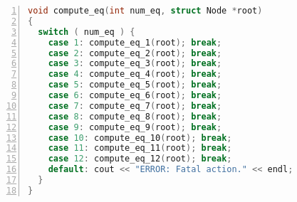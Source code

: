 \vspace*{0.2cm}
\begin{lstlisting}[language=C++, basicstyle=\scriptsize, numbers=left, columns=fullflexible]
void compute_eq(int num_eq, struct Node *root)
{
  switch ( num_eq ) {
    case 1: compute_eq_1(root); break;
    case 2: compute_eq_2(root); break;
    case 3: compute_eq_3(root); break;
    case 4: compute_eq_4(root); break;
    case 5: compute_eq_5(root); break;
    case 6: compute_eq_6(root); break;
    case 7: compute_eq_7(root); break;
    case 8: compute_eq_8(root); break;
    case 9: compute_eq_9(root); break;
    case 10: compute_eq_10(root); break;
    case 11: compute_eq_11(root); break;
    case 12: compute_eq_12(root); break;
    default: cout << "ERROR: Fatal action." << endl;
  }
}
\end{lstlisting}
\vspace*{0.2cm}

\normalsize
